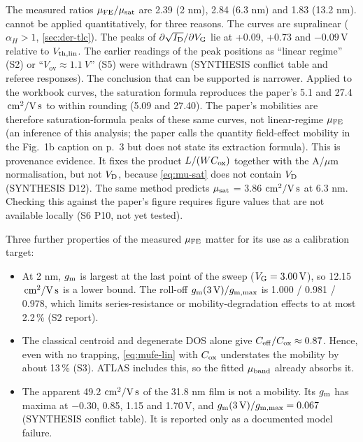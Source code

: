 The measured ratios $\mu_{\mathrm{FE}}/\mu_{\mathrm{sat}}$ are 2.39 (2 nm), 2.84 (6.3 nm) and 1.83 (13.2 nm).  cannot be applied quantitatively, for three reasons. The curves are supralinear ($\alpha_H>1$, \cref{sec:der-tlc}). The peaks of $\partial\sqrt{I_{\mathrm{D}}}/\partial V_{\mathrm{G}}$ lie at +0.09, +0.73 and $-0.09$\,V relative to $V_{\mathrm{th,lin}}$. The earlier readings of the peak positions as ``linear regime'' (S2) or ``$V_{\mathrm{ov}}\approx\SI{1.1}{V}$'' (S5) were withdrawn (SYNTHESIS conflict table and referee responses). The conclusion that can be supported is narrower. Applied to the workbook curves, the saturation formula reproduces the paper's 5.1 and 27.4\,$\,\mathrm{cm}^{2}/\mathrm{V\,s}$ \citep[p.~7]{Januar2026} to within rounding (5.09 and 27.40). The paper's mobilities are therefore saturation-formula peaks of these same curves, not linear-regime $\mu_{\mathrm{FE}}$ (an inference of this analysis; the paper calls the quantity field-effect mobility in the Fig.~1b caption on p.~3 but does not state its extraction formula). This is provenance evidence. It fixes the product $L/(WC_{\mathrm{ox}})$ together with the A/$\mu$m normalisation, but not $V_{\mathrm{D}}$, because \cref{eq:mu-sat} does not contain $V_{\mathrm{D}}$ (SYNTHESIS D12). The same method predicts $\mu_{\mathrm{sat}}$ = 3.86\,$\,\mathrm{cm}^{2}/\mathrm{V\,s}$ at 6.3 nm. Checking this against the paper's figure requires figure values that are not available locally (S6 P10, not yet tested).

Three further properties of the measured $\mu_{\mathrm{FE}}$ matter for its use as a calibration target:
\begin{itemize}
\item At 2 nm, $g_{\mathrm{m}}$ is largest at the last point of the sweep ($V_{\mathrm{G}}=\SI{3.00}{V}$), so 12.15\,$\,\mathrm{cm}^{2}/\mathrm{V\,s}$ is a lower bound. The roll-off $g_{\mathrm{m}}(\SI{3}{V})/g_{\mathrm{m,max}}$ is 1.000 / 0.981 / 0.978, which limits series-resistance or mobility-degradation effects to at most 2.2\,\% (S2 report).
\item The classical centroid and degenerate DOS alone give $C_{\mathrm{eff}}/C_{\mathrm{ox}}\approx0.87$. Hence, even with no trapping, \cref{eq:mufe-lin} with $C_{\mathrm{ox}}$ understates the mobility by about 13\,\% (S3). ATLAS includes this, so the fitted $\mu_{\mathrm{band}}$ already absorbs it.
\item The apparent 49.2\,$\,\mathrm{cm}^{2}/\mathrm{V\,s}$ of the 31.8 nm film is not a mobility. Its $g_{\mathrm{m}}$ has maxima at $-0.30$, 0.85, 1.15 and 1.70\,V, and $g_{\mathrm{m}}(\SI{3}{V})/g_{\mathrm{m,max}}=0.067$ (SYNTHESIS conflict table). It is reported only as a documented model failure.
\end{itemize}

